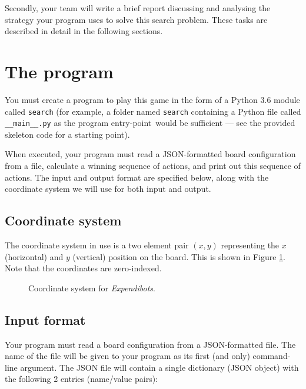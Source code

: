 \documentclass[]{article}
\newcommand{\gameName}{Expendibots}
\begin{document}
Secondly, your team will write a brief report discussing and analysing
the strategy your program uses to solve this search problem. These tasks
are described in detail in the following sections.

\section*{The program}

You must create a program to play this game in the form of a Python 3.6
module called \texttt{search}
(for example, a folder named \texttt{search} containing a Python file
called \texttt{\_\_main\_\_.py} as the program entry-point\footnotemark\ 
would be sufficient
--- see the provided skeleton code for a starting point).


When executed, your program must read a JSON-formatted board
configuration from a file, calculate a winning sequence of actions, and
print out this sequence of actions. The input and output format are
specified below, along with the coordinate system we will use for both
input and output.

\subsection*{Coordinate system}

The coordinate system in use is a two element pair $(x, y)$ representing the
$x$ (horizontal) and $y$ (vertical) position on the board. This is shown in 
Figure \ref{fig:coordinates}. Note that the coordinates are zero-indexed.

\begin{figure}[ht!]
\centering
{}
\caption{Coordinate system for \emph{\gameName}.}
\label{fig:coordinates}
\end{figure}

\subsection*{Input format}
Your program must read a board configuration from a JSON-formatted file.
The name of the file will be given to your program as its first (and
only) command-line argument. The JSON file will contain a single
dictionary (JSON object) with the following 2 entries (name/value
pairs):\footnotemark
\end{document}
